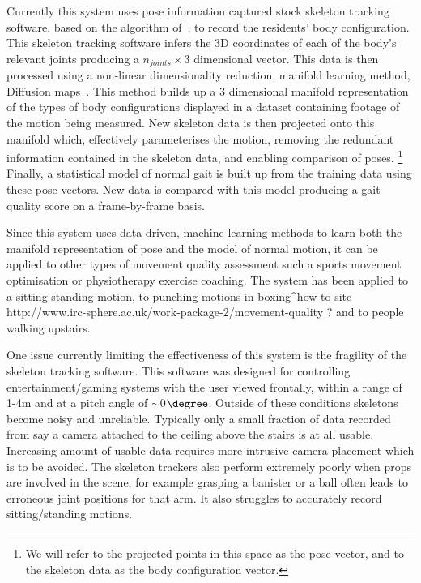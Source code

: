 \documentclass[11pt]{article} %
\begin{document}
Currently this system uses pose information captured stock skeleton tracking software, based on the algorithm of~\cite{Shotton2011}, to record the residents' body configuration. This skeleton tracking software infers the 3D coordinates of each of the body's relevant joints producing a $n_{joints} \times 3$ dimensional vector. This data is then processed using a non-linear dimensionality reduction, manifold learning method, Diffusion maps~\cite{Coifman2006}. This method builds up a 3 dimensional manifold representation of the types of body configurations displayed in a dataset containing footage of the motion being measured. New skeleton data is then projected onto this manifold which, effectively parameterises the motion, removing the redundant information contained in the skeleton data, and enabling comparison of poses. \footnote{We will refer to the projected points in this space as the pose vector, and to the skeleton data as the body configuration vector.} Finally, a statistical model of normal gait is built up from the training data using these pose vectors. New data is compared with this model producing a gait quality score on a frame-by-frame basis.

Since this system uses data driven, machine learning methods to learn both the manifold representation of pose and the model of normal motion, it can be applied to other types of movement quality assessment such a sports movement optimisation or physiotherapy exercise coaching. The system has been applied to a sitting-standing motion, to punching motions in boxing^{how to site http://www.irc-sphere.ac.uk/work-package-2/movement-quality ?} and to people walking upstairs. 

One issue currently limiting the effectiveness of this system is the fragility of the skeleton tracking software. This software was designed for controlling entertainment/gaming systems with the user viewed frontally, within a range of 1-4m and at a pitch angle of $\sim$0$\degree$. Outside of these conditions skeletons become noisy and unreliable. Typically only a small fraction of data recorded from say a camera attached to the ceiling above the stairs is at all usable. Increasing amount of usable data requires more intrusive camera placement which is to be avoided. The skeleton trackers also perform extremely poorly when props are involved in the scene, for example grasping a banister or a ball often leads to erroneous joint positions for that arm. It also struggles to accurately record sitting/standing motions.
\end{document}
